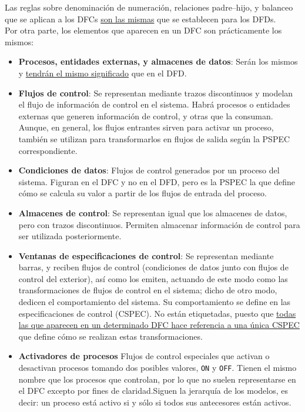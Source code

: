 Las reglas sobre denominación de numeración, relaciones padre--hijo, y balanceo que se aplican a los DFCs \uline{son las mismas} que se establecen para los DFDs.\\

Por otra parte, los elementos que aparecen en un DFC son prácticamente los mismos:

\begin{itemize}
    \item \textbf{Procesos, entidades externas, y almacenes de datos}: Serán los mismos y \uline{tendrán el mismo significado} que en el DFD.
    \item \textbf{Flujos de control}: Se representan mediante trazos discontinuos y modelan el flujo de información de control en el sistema. Habrá procesos o entidades externas que generen información de control, y otras que la consuman. Aunque, en general, los flujos entrantes sirven para activar un proceso, también se utilizan para transformarlos en flujos de salida según la PSPEC correspondiente.
    \item \textbf{Condiciones de datos}: Flujos de control generados por un proceso del sistema. Figuran en el DFC y no en el DFD, pero es la PSPEC la que define cómo se calcula su valor a partir de los flujos de entrada del proceso.
    \item \textbf{Almacenes de control}: Se representan igual que los almacenes de datos, pero con trazos discontinuos. Permiten almacenar información de control para ser utilizada posteriormente.
    \item \textbf{Ventanas de especificaciones de control}: Se representan mediante barras, y reciben flujos de control (condiciones de datos junto con flujos de control del exterior), así como los emiten, actuando de este modo como las transformaciones de flujos de control en el sistema; dicho de otro modo, dedicen el comportamiento del sistema. Su comportamiento se define en las especificaciones de control (CSPEC). No están etiquetadas, puesto que \uline{todas las que aparecen en un determinado DFC hace referencia a una única CSPEC} que define cómo se realizan estas transformaciones.
    \item \textbf{Activadores de procesos} Flujos de control especiales que activan o desactivan procesos tomando dos posibles valores, \texttt{ON} y \texttt{OFF}. Tienen el mismo nombre que los procesos que controlan, por lo que no suelen representarse en el DFC excepto por fines de claridad.Siguen la jerarquía de los modelos, es decir: un proceso está activo si y sólo si todos sus antecesores están activos.
\end{itemize}

